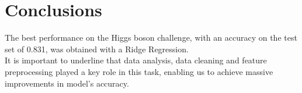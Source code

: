 \documentclass[10pt,conference,compsocconf]{IEEEtran}
\begin{document}
\section{Conclusions}
The best performance on the Higgs boson
challenge, with an accuracy on the test set of
0.831, was obtained with a Ridge Regression.\\
It is important to underline that data analysis, data cleaning and feature preprocessing played a key role in this task, enabling us to achieve massive improvements in model's accuracy.\\





\end{document}
